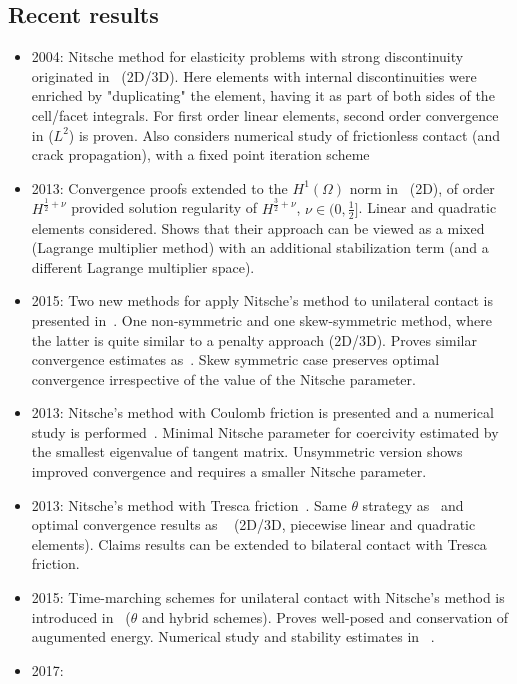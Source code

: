 \documentclass[12pt]{article}
\begin{document}
\subsection{Recent results}
\begin{itemize}
\item 2004: Nitsche method for elasticity problems with strong discontinuity originated in~\cite{HANSBO20043523} (2D/3D). 
Here elements with internal discontinuities were enriched by "duplicating" the element, having it as part of both sides of the cell/facet integrals.
For first order linear elements, second order convergence in ($L^2$) is proven. Also considers numerical study of frictionless contact (and crack propagation), with a fixed point iteration scheme
\item 2013: Convergence proofs extended to the $H^1(\Omega)$ norm in~\cite{choly2013unilateral} (2D), of order $H^{\frac{1}{2}+\nu}$ provided solution regularity of $H^{\frac{3}{2}+\nu}$, $\nu\in(0,\frac{1}{2}]$.
Linear and quadratic elements considered.
Shows that their approach can be viewed as a mixed (Lagrange multiplier method) with an additional stabilization term (and a different Lagrange multiplier space).
\item 2015: Two new methods for apply Nitsche's method to unilateral contact is presented in~\cite{chouly2015symm}. 
One non-symmetric and one skew-symmetric method, where the latter is quite similar to a penalty approach (2D/3D). Proves similar convergence estimates as~\cite{choly2013unilateral}.
Skew symmetric case preserves optimal convergence irrespective of the value of the Nitsche parameter.
\item  2013: Nitsche's method with Coulomb friction is presented and a numerical study is performed~\cite{RENARD201338}. 
Minimal Nitsche parameter for coercivity estimated by the smallest eigenvalue of tangent matrix. Unsymmetric version shows improved convergence and requires a smaller Nitsche parameter.
\item 2013: Nitsche's method with Tresca friction~\cite{CHOULY2014TRESCA}. Same $\theta$ strategy as~\cite{chouly2015symm} and optimal convergence results as ~\cite{choly2013unilateral} (2D/3D, piecewise linear and quadratic elements). Claims results can be extended to bilateral contact with Tresca friction.
\item 2015: Time-marching schemes for unilateral contact with Nitsche's method is introduced in~\cite{chouly2015timedep} ($\theta$ and hybrid schemes). Proves well-posed and conservation of augumented energy. Numerical study and stability estimates in ~\cite{chouly2015timedep2}.
\item 2017: ~\cite{MLIKA2017selfcontact}
\end{itemize}



\printbibliography
\end{document}
